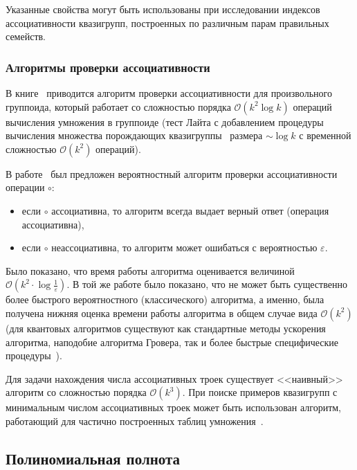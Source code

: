     Указанные свойства могут быть использованы при исследовании индексов ассоциативности квазигрупп, построенных по различным парам правильных семейств.

\subsubsection{Алгоритмы проверки ассоциативности}

    В книге~\cite[раздел~1.2]{clifford61} приводится алгоритм проверки ассоциативности для произвольного группоида, который работает со сложностью порядка $\mathcal{O}(k^2 \log k)$ операций вычисления умножения в группоиде (тест Лайта с добавлением процедуры вычисления множества порождающих квазигруппы~\cite{miller1978nlog} размера $\sim \log k$ с временной сложностью $\mathcal{O}(k^2)$ операций).

    В работе~\cite{rajagopalan2000verification} был предложен вероятностный алгоритм проверки ассоциативности операции $\circ$:
    \begin{itemize}
        \item если $\circ$ ассоциативна, то алгоритм всегда выдает верный ответ (операция ассоциативна), 
        \item если $\circ$ неассоциативна, то алгоритм может ошибаться с вероятностью $\varepsilon$.
    \end{itemize}
    Было показано, что время работы алгоритма оценивается величиной $\mathcal{O}(k^2 \cdot \log \frac{1}{\varepsilon})$. 
    В той же работе было показано, что не может быть существенно более быстрого вероятностного (классического) алгоритма, а именно, была получена нижняя оценка времени работы алгоритма в общем случае вида $\mathcal{O}(k^2)$ (для квантовых алгоритмов существуют как стандартные методы ускорения алгоритма, наподобие алгоритма Гровера, так и более быстрые специфические процедуры~\cite{childs2010quantum}).

    Для задачи нахождения числа ассоциативных троек существует <<наивный>> алгоритм со сложностью порядка $\mathcal{O}(k^3)$.
    При поиске примеров квазигрупп с минимальным числом ассоциативных троек может быть использован алгоритм, работающий для частично построенных таблиц умножения~\cite{valent2018small}.


\subsection{Полиномиальная полнота}

